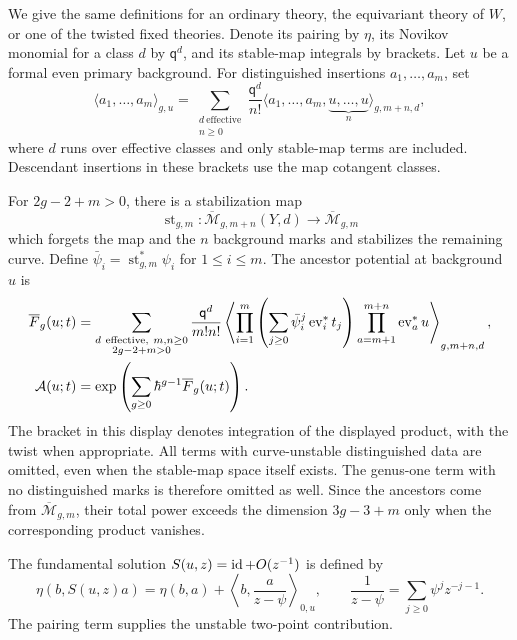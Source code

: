 We give the same definitions for an ordinary theory, the equivariant
theory of $W$, or one of the twisted fixed theories.  Denote its pairing
by $\eta$, its Novikov monomial for a class $d$ by $\mathsf q^d$, and
its stable-map integrals by brackets.  Let $u$ be a formal even primary
background.  For distinguished insertions $a_1,\ldots,a_m$, set
\[
 \langle a_1,\ldots,a_m\rangle_{g,u}
   =\sum_{\substack{d\ \mathrm{effective}\\n\geq0}}
      \frac{\mathsf q^d}{n!}
        \langle a_1,\ldots,a_m,
                   \underbrace{u,\ldots,u}_{n}\rangle_{g,m+n,d},
\]
where $d$ runs over effective classes and only stable-map terms are
included.  Descendant insertions in these brackets use the map cotangent
classes.

For $2g-2+m>0$, there is a stabilization map
\[
 \operatorname{st}_{g,m}:
 \overline{\mathcal M}_{g,m+n}(Y,d)
     \longrightarrow\overline{\mathcal M}_{g,m}
\]
which forgets the map and the $n$ background marks and stabilizes the
remaining curve.  Define $\bar\psi_i=\operatorname{st}_{g,m}^*\psi_i$ for
$1\leq i\leq m$.  The ancestor potential at background $u$ is
\begin{equation}
\begin{split}
 \overline F_g(u;t)
  &=\sum_{\substack{d\ \mathrm{effective},\ m,n\geq0\\2g-2+m>0}}
     \frac{\mathsf q^d}{m!n!}
       \left\langle
        \prod_{i=1}^m\left(\sum_{j\geq0}\bar\psi_i^j\operatorname{ev}_i^*t_j\right)
        \prod_{a=m+1}^{m+n}\operatorname{ev}_a^*u
       \right\rangle_{g,m+n,d},\\
 \mathcal A(u;t)&=
       \exp\left(\sum_{g\geq0}\hbar^{g-1}\overline F_g(u;t)\right).
\end{split}
\label{geo:ancestor-potential}
\end{equation}
The bracket in this display denotes integration of the displayed product,
with the twist when appropriate.  All terms with curve-unstable
distinguished data are omitted, even when the stable-map space itself
exists.  The genus-one term with no distinguished marks is therefore
omitted as well.  Since the ancestors come from
$\overline{\mathcal M}_{g,m}$, their total power exceeds the dimension
$3g-3+m$ only when the corresponding product vanishes.

\begin{definition}\label{geo:fundamental}
The fundamental solution $S(u,z)=\operatorname{id}+O(z^{-1})$ is defined by
\begin{equation}
 \eta(b,S(u,z)a)
    =\eta(b,a)+\left\langle b,\frac{a}{z-\psi}\right\rangle_{0,u},
 \qquad
 \frac1{z-\psi}=\sum_{j\geq0}\psi^jz^{-j-1}.
 \label{geo:S-definition}
\end{equation}
The pairing term supplies the unstable two-point contribution.
\end{definition}

